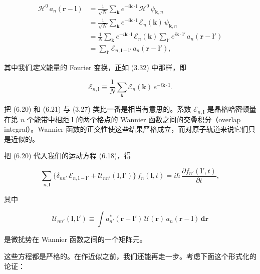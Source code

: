 \begin{align*}
\mathcal{H}^0\,a_n(\mathbf{r}-\boldsymbol{l}) &= \frac{1}{\sqrt{N}}\sum_{\mathbf{k}} e^{-i\mathbf{k}\cdot\boldsymbol{l}}\,\mathcal{H}^0\,\psi_{\mathbf{k},n} \\
&= \frac{1}{\sqrt{N}}\sum_{\mathbf{k}} e^{-i\mathbf{k}\cdot\boldsymbol{l}}\,\mathcal{E}_n(\mathbf{k})\,\psi_{\mathbf{k},n} \\
&= \frac{1}{N}\sum_{\mathbf{k}} e^{-i\mathbf{k}\cdot\boldsymbol{l}}\,\mathcal{E}_n(\mathbf{k})\sum_{\boldsymbol{l}'} e^{i\mathbf{k}\cdot\boldsymbol{l}'}\,a_n(\mathbf{r}-\boldsymbol{l}') \\
&= \sum_{\boldsymbol{l}'} \mathcal{E}_{n,\boldsymbol{l}-\boldsymbol{l}'}\,a_n(\mathbf{r}-\boldsymbol{l}'), \tag{6.20}
\end{align*}

其中我们\emph{定义}能量的 Fourier 变换，正如 (3.32) 中那样，即

\begin{equation*}
\mathcal{E}_{n,\boldsymbol{l}} \equiv \frac{1}{N}\sum_{\mathbf{k}} \mathcal{E}_n(\mathbf{k})\,e^{-i\mathbf{k}\cdot\boldsymbol{l}}.
\tag{6.21}
\end{equation*}

把 (6.20) 和 (6.21) 与 (3.27) 类比一番是相当有意思的。系数 $\mathcal{E}_{n,\boldsymbol{l}}$ 是晶格哈密顿量在第 $n$ 个能带中相距 $\boldsymbol{l}$ 的两个格点的 Wannier 函数之间的交叠积分（overlap integral）。Wannier 函数的正交性使这些结果严格成立，而对原子轨道来说它们只是近似的。

把 (6.20) 代入我们的运动方程 (6.18)，得

\begin{equation*}
\sum_{n,\boldsymbol{l}} \big\{\delta_{nn'}\,\mathcal{E}_{n,\boldsymbol{l}-\boldsymbol{l}'} + \mathcal{U}_{nn'}(\boldsymbol{l},\boldsymbol{l}')\big\}\,f_n(\boldsymbol{l},t) = i\hbar\,\frac{\partial f_{n'}(\boldsymbol{l}',t)}{\partial t},
\tag{6.22}
\end{equation*}

其中

\begin{equation*}
\mathcal{U}_{nn'}(\boldsymbol{l},\boldsymbol{l}') \equiv \int a_{n'}^{*}(\mathbf{r}-\boldsymbol{l}')\,\mathcal{U}(\mathbf{r})\,a_n(\mathbf{r}-\boldsymbol{l})\,\mathbf{dr}
\tag{6.23}
\end{equation*}

是微扰势在 Wannier 函数之间的一个矩阵元。

这些方程都是严格的。在作近似之前，我们还能再走一步。考虑下面这个形式化的论证：

